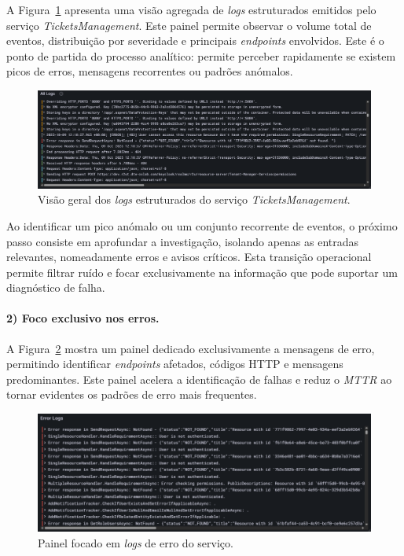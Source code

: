 A Figura~\ref{fig:dash-1} apresenta uma visão agregada de \textit{logs} estruturados emitidos pelo 
serviço \textit{TicketsManagement}. Este painel permite observar o volume total de eventos, 
distribuição por severidade e principais \textit{endpoints} envolvidos. Este é o ponto de partida do processo analítico: permite perceber rapidamente se existem picos de erros, mensagens recorrentes ou padrões anómalos.

\begin{figure}[H]
    \centering
    \includegraphics[width=\textwidth]{images/Grafana/all_logs_dashboard.png}
    \caption{Visão geral dos \textit{logs} estruturados do serviço \textit{TicketsManagement}.}
    \label{fig:dash-1}
\end{figure}

Ao identificar um pico anómalo ou um conjunto recorrente de eventos, o próximo passo consiste em 
aprofundar a investigação, isolando apenas as entradas relevantes, nomeadamente erros e avisos críticos. Esta transição operacional permite filtrar ruído e focar exclusivamente na informação que pode suportar um diagnóstico de falha.



\paragraph{2) Foco exclusivo nos erros.}

A Figura~\ref{fig:dash-2} mostra um painel dedicado exclusivamente a mensagens de erro, 
permitindo identificar \textit{endpoints} afetados, códigos HTTP e mensagens predominantes. 
Este painel acelera a identificação de falhas e reduz o \textit{MTTR} ao tornar evidentes os padrões de erro mais frequentes.

\begin{figure}[H]
    \centering
    \includegraphics[width=\textwidth]{images/Grafana/error_logs_dashboard.png}
    \caption{Painel focado em \textit{logs} de erro do serviço.}
    \label{fig:dash-2}
\end{figure}

